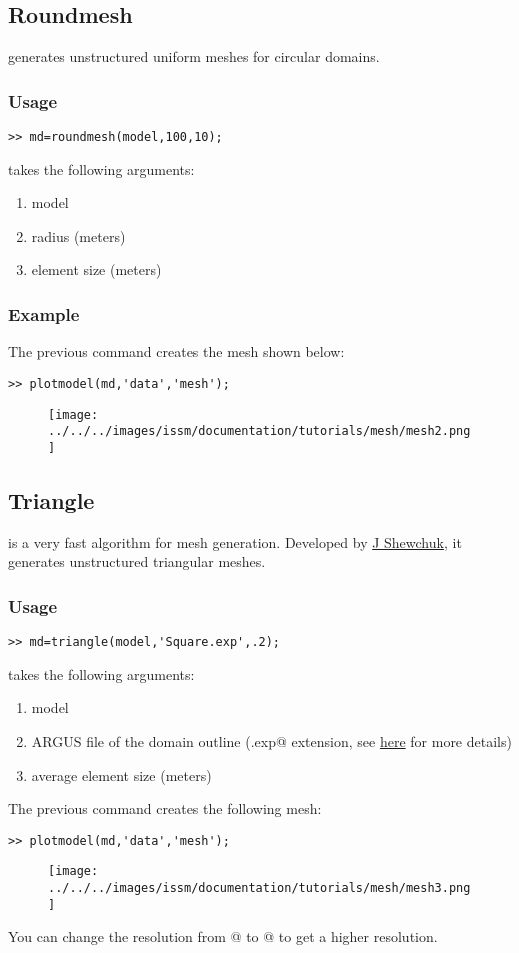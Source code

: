 \subsection{Roundmesh}%
\verb@roundmesh@ generates unstructured uniform meshes for circular domains.
\subsubsection{Usage}
\begin{verbatim}>> md=roundmesh(model,100,10);\end{verbatim}
\verb@roundmesh@ takes the following arguments:
\begin{enumerate}
	\item model
	\item radius (meters)
	\item element size (meters)
\end{enumerate}
\subsubsection{Example}
The previous command creates the mesh shown below:
\begin{verbatim}>> plotmodel(md,'data','mesh');\end{verbatim}
\begin{figure}[H]
	\begin{center}
		\texttt{[image: ../../../images/issm/documentation/tutorials/mesh/mesh2.png]}
	\end{center}
\end{figure}
\subsection{Triangle}%
\verb@triangle@ is a very fast algorithm for mesh generation. Developed by \href{http://www.cs.cmu.edu/~quake/triangle.html}{J Shewchuk}, it generates unstructured triangular meshes.
\subsubsection{Usage}
\begin{verbatim}>> md=triangle(model,'Square.exp',.2);\end{verbatim}
\verb@triangle@ takes the following arguments:
\begin{enumerate}
	\item model
	\item ARGUS file of the domain outline (\verb@.exp@ extension, see \href{http://issm.jpl.nasa.gov/documentation/mesh/}{here} for more details)
	\item average element size (meters)
\end{enumerate}
The previous command creates the following mesh:
\begin{verbatim}>> plotmodel(md,'data','mesh');\end{verbatim}
\begin{figure}[H]
	\begin{center}
		\texttt{[image: ../../../images/issm/documentation/tutorials/mesh/mesh3.png]}
	\end{center}
\end{figure}
You can change the resolution from @ to @ to get a higher resolution.
